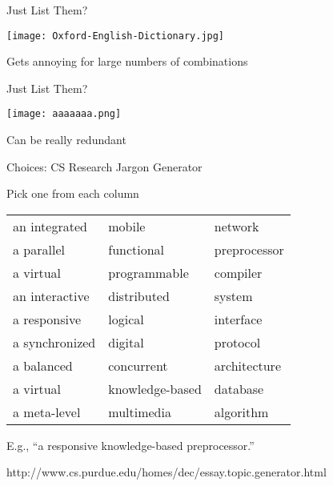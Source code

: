 \documentclass{plt}
\begin{document}
\begin{frame}{Just List Them?}

  \texttt{[image: Oxford-English-Dictionary.jpg]}

  Gets annoying for large numbers of combinations

\end{frame}

\begin{frame}{Just List Them?}
  \begin{center}    
    \texttt{[image: aaaaaaa.png]}
  
    Can be really redundant
  \end{center}
\end{frame}

\begin{frame}{Choices: CS Research Jargon Generator}

\begin{center}

Pick one from each column
\medskip

\begin{tabular}{lll}
\cmidrule(lr){1-1}
\cmidrule(lr){2-2}
\cmidrule(lr){3-3}
an integrated    & mobile          & network        \\
a parallel       & functional      & preprocessor   \\
a virtual        & programmable    & compiler       \\
an interactive   & distributed     & system         \\
a responsive     & logical         & interface      \\
a synchronized   & digital         & protocol       \\
a balanced       & concurrent      & architecture   \\
a virtual        & knowledge-based & database       \\
a meta-level     & multimedia      & algorithm      \\
\cmidrule(lr){1-1}
\cmidrule(lr){2-2}
\cmidrule(lr){3-3}
\end{tabular}

\medskip

E.g., ``a responsive knowledge-based preprocessor.''

\tiny
http://www.cs.purdue.edu/homes/dec/essay.topic.generator.html
\end{center}
\end{frame}
\end{document}
